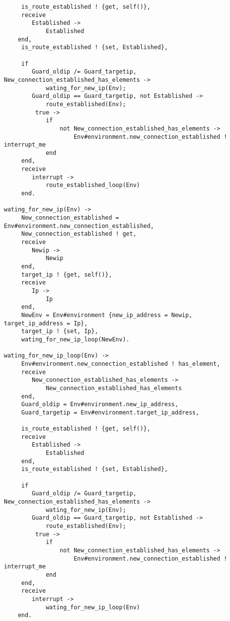 \begin{verbatim}
     is_route_established ! {get, self()},
     receive 
        Established -> 
            Established
    end,
     is_route_established ! {set, Established},
     
     if
        Guard_oldip /= Guard_targetip, New_connection_established_has_elements ->
            wating_for_new_ip(Env);
        Guard_oldip == Guard_targetip, not Established ->
            route_established(Env);
         true ->
            if
                not New_connection_established_has_elements ->
                    Env#environment.new_connection_established ! interrupt_me
            end
     end,
     receive 
        interrupt -> 
            route_established_loop(Env)
     end.

wating_for_new_ip(Env) -> 
     New_connection_established = Env#environment.new_connection_established,
     New_connection_established ! get,
     receive 
        Newip -> 
            Newip
     end,
     target_ip ! {get, self()},
     receive 
        Ip -> 
            Ip
     end,
     NewEnv = Env#environment {new_ip_address = Newip, target_ip_address = Ip},
     target_ip ! {set, Ip},
     wating_for_new_ip_loop(NewEnv).

wating_for_new_ip_loop(Env) -> 
     Env#environment.new_connection_established ! has_element,
     receive 
        New_connection_established_has_elements -> 
            New_connection_established_has_elements
     end,
     Guard_oldip = Env#environment.new_ip_address,
     Guard_targetip = Env#environment.target_ip_address,
     
     is_route_established ! {get, self()},
     receive 
        Established -> 
            Established
     end,
     is_route_established ! {set, Established},
     
     if
        Guard_oldip /= Guard_targetip, New_connection_established_has_elements ->
            wating_for_new_ip(Env);
        Guard_oldip == Guard_targetip, not Established ->
            route_established(Env);
         true ->
            if
                not New_connection_established_has_elements ->
                    Env#environment.new_connection_established ! interrupt_me
            end
     end,
     receive 
        interrupt -> 
            wating_for_new_ip_loop(Env)
    end.
\end{verbatim}
\normalsize
